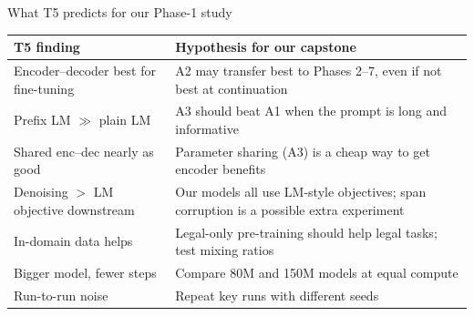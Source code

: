 \documentclass[aspectratio=169,11pt]{beamer}
\begin{document}
\begin{frame}{What T5 predicts for our Phase-1 study}
  \small
  \begin{tabularx}{\textwidth}{@{}lX@{}}
    \toprule
    T5 finding & Hypothesis for our capstone\\
    \midrule
    Encoder--decoder best for fine-tuning & A2 may transfer best to Phases 2--7, even if not best at continuation\\
    Prefix LM $\gg$ plain LM & A3 should beat A1 when the prompt is long and informative\\
    Shared enc--dec nearly as good & Parameter sharing (A3) is a cheap way to get encoder benefits\\
    Denoising $>$ LM objective downstream & Our models all use LM-style objectives; span corruption is a possible extra experiment\\
    In-domain data helps & Legal-only pre-training should help legal tasks; test mixing ratios\\
    Bigger model, fewer steps & Compare 80M and 150M models at equal compute\\
    Run-to-run noise & Repeat key runs with different seeds\\
    \bottomrule
  \end{tabularx}
\end{frame}
\end{document}
